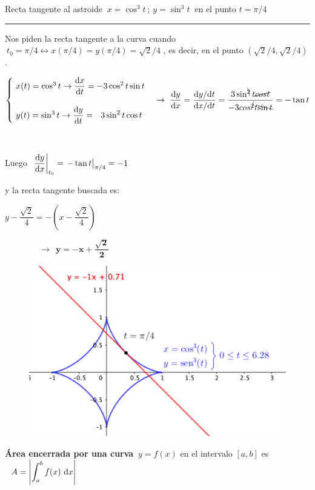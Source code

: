 \begin{miejercicio}
	
Recta tangente al astroide  $\ x=\cos^3 t\, ; \ y=\sin^3 t \ $ en el punto $t=\pi/4$

\rule{300pt}{0.2pt}	

Nos piden la recta tangente a la curva cuando $\ t_0=\pi/4 \leftrightarrow x(\pi/4)=y(\pi/4)=\sqrt 2/4$ , es decir, en el punto $(\sqrt 2/4,\sqrt 2/4)$.

$ \begin{cases} 
\ x(t)=\cos^3 t \to \displaystyle \dv{x}{t}=-3\cos^2 t \sin t  
\\ \\ 
\ y(t)=\sin^3 t \to \displaystyle \dv{y}{t}=\ \ 3\sin^2 t \cos t 
\end{cases}  
\to  \ 
\displaystyle \dv{y}{x}=\dfrac{\dd y / \dd t}{\dd x / \dd t} =
\dfrac{3\sin^{\bcancel{2}} t \cancel{cos t}}{-3\\cos^{\cancel{2}} t \bcancel{\sin t}}= -\tan t$

\begin{multicols}{2}
$\quad$

Luego $\ \eval{\displaystyle \dv{y}{x}}_{t_0}= \eval{-\tan t}_{\pi/4}=-1 \ $ 

y la recta tangente buscada es:


$y-\dfrac{\sqrt{2}}{4}=-(x-\dfrac{\sqrt{2}}{4}) $

$\qquad  \qquad \to \ \ \boldsymbol{ y=-x+\dfrac{\sqrt{2}}{2} }$
\begin{figure}[H]
	\centering
	\includegraphics[width=.45\textwidth]{img-polares/polares16.png}
	\end{figure}
\end{multicols}
\vspace{1mm}
\end{miejercicio}

\vspace{5mm}


\large{\textbf{Área encerrada por una curva}}\normalsize{ $\ y=f(x)$ en} el intervalo $[a,b]$ es $\ \ A=\abs{\displaystyle \int_a^b f(x)\ \dd x}$

